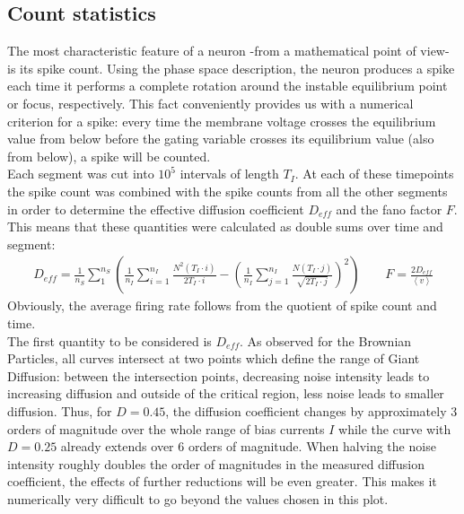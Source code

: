 \documentclass[12pt,a4paper]{article}
\begin{document}
\subsection{Count statistics}
The most characteristic feature of a neuron -from a mathematical point of view- is its spike count. Using the phase space description, the neuron produces a spike each time it performs a complete rotation around the instable equilibrium point or focus, respectively. This fact conveniently provides us with a numerical criterion for a spike:
every time the membrane voltage crosses the equilibrium value from below before the gating variable crosses its equilibrium value (also from below), a spike will be counted. \\
Each segment was cut into $10^5$ intervals of length $T_I$. At each of these timepoints the spike count was combined with the spike counts from all the other segments in order to determine the effective diffusion coefficient $D_{eff}$ and the fano factor $F$. This means that these quantities were calculated as double sums over time and segment:
\begin{align*}
D_{eff}=\frac{1}{n_S}\sum_{1}^{n_S}\left(\frac{1}{n_I}\sum_{i=1}^{n_I}\frac{N^2(T_I\cdot i)}{2T_I\cdot i}-\left(\frac{1}{n_I}\sum_{j=1}^{n_I}\frac{N(T_I\cdot j)}{\sqrt{2T_I\cdot j}}\right)^2\right)\qquad F=\frac{2D_{eff}}{\left<v\right>}
\end{align*}
Obviously, the average firing rate follows from the quotient of spike count and time.\\
The first quantity to be considered is $D_{eff}$.
As observed for the Brownian Particles, all curves intersect at two points which define the range of Giant Diffusion: between the intersection points, decreasing noise intensity leads to increasing diffusion and outside of the critical region, less noise leads to smaller diffusion. Thus, for $D=0.45$, the diffusion coefficient changes by approximately 3 orders of magnitude over the whole range of bias currents $I$ while the curve with $D=0.25$ already extends over 6 orders of magnitude. When halving the noise intensity roughly doubles the order of magnitudes in the measured diffusion coefficient, the effects of further reductions will be even greater. This makes it numerically very difficult to go beyond the values chosen in this plot.
\end{document}
